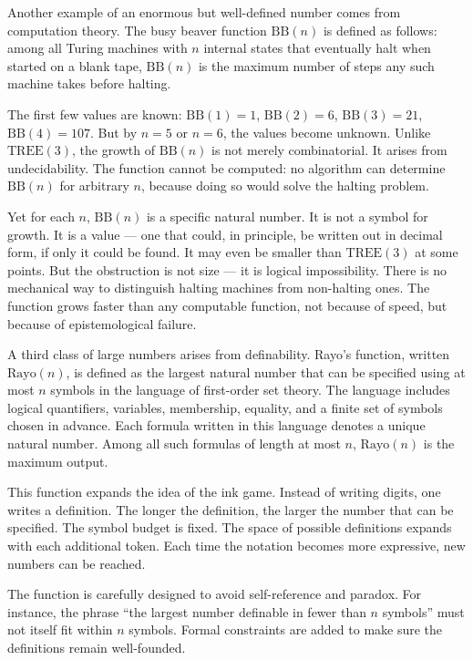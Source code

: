 Another example of an enormous but well-defined number comes from computation theory. The busy beaver function $\mathrm{BB}(n)$ is defined as follows: among all Turing machines with $n$ internal states that eventually halt when started on a blank tape, $\mathrm{BB}(n)$ is the maximum number of steps any such machine takes before halting.

The first few values are known: $\mathrm{BB}(1) = 1$, $\mathrm{BB}(2) = 6$, $\mathrm{BB}(3) = 21$, $\mathrm{BB}(4) = 107$. But by $n = 5$ or $n = 6$, the values become unknown. Unlike $\mathrm{TREE}(3)$, the growth of $\mathrm{BB}(n)$ is not merely combinatorial. It arises from undecidability. The function cannot be computed: no algorithm can determine $\mathrm{BB}(n)$ for arbitrary $n$, because doing so would solve the halting problem.

Yet for each $n$, $\mathrm{BB}(n)$ is a specific natural number. It is not a symbol for growth. It is a value — one that could, in principle, be written out in decimal form, if only it could be found. It may even be smaller than $\mathrm{TREE}(3)$ at some points. But the obstruction is not size — it is logical impossibility. There is no mechanical way to distinguish halting machines from non-halting ones. The function grows faster than any computable function, not because of speed, but because of epistemological failure.

A third class of large numbers arises from definability. Rayo's function, written $\mathrm{Rayo}(n)$, is defined as the largest natural number that can be specified using at most $n$ symbols in the language of first-order set theory. The language includes logical quantifiers, variables, membership, equality, and a finite set of symbols chosen in advance. Each formula written in this language denotes a unique natural number. Among all such formulas of length at most $n$, $\mathrm{Rayo}(n)$ is the maximum output.

This function expands the idea of the ink game. Instead of writing digits, one writes a definition. The longer the definition, the larger the number that can be specified. The symbol budget is fixed. The space of possible definitions expands with each additional token. Each time the notation becomes more expressive, new numbers can be reached.

The function is carefully designed to avoid self-reference and paradox. For instance, the phrase “the largest number definable in fewer than $n$ symbols” must not itself fit within $n$ symbols. Formal constraints are added to make sure the definitions remain well-founded.


